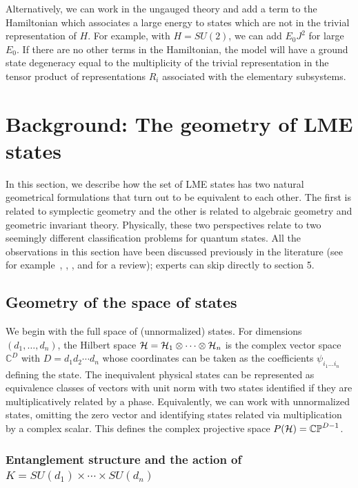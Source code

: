 \documentclass[12pt]{article}
\theoremstyle{definition}
\begin{document}
Alternatively, we can work in the ungauged theory and add a term to the Hamiltonian which associates a large energy to states which are not in the trivial representation of $H$. For example, with $H = SU(2)$, we can add $E_0 J^2$ for large $E_0$. If there are no other terms in the Hamiltonian, the model will have a ground state degeneracy equal to the multiplicity of the trivial representation in the tensor product of representations $R_i$ associated with the elementary subsystems.


\section{Background: The geometry of LME states}

In this section, we describe how the set of LME states has two natural geometrical formulations that turn out to be equivalent to each other. The first is related to symplectic geometry and the other is related to algebraic geometry and geometric invariant theory. Physically, these two perspectives relate to two seemingly different classification problems for quantum states. All the observations in this section have been discussed previously in the literature (see for example~\cite{Kly02}, \cite[\S~3]{Kly07}, \cite[\S~4]{wallach}, and \cite{Walter} for a review); experts can skip directly to section 5.

\subsection{Geometry of the space of states}

We begin with the full space of (unnormalized) states. For dimensions $(d_1,\dots, d_n)$, the Hilbert space ${\cal H} = {\cal H}_1 \otimes \cdots \otimes {\cal H}_n$ is the complex vector space  $\mathbb{C}^{D}$ with $D = d_1 d_2 \cdots d_n$ whose coordinates can be taken as the coefficients $\psi_{i_1 \dots i_n}$ defining the state. The inequivalent physical states can be represented as equivalence classes of vectors with unit norm with two states identified if they are multiplicatively related by a phase. Equivalently, we can work with unnormalized states, omitting the zero vector and identifying states related via multiplication by a complex scalar. This defines the complex projective space $P({\cal H}) = \mathbb{C P}^{D-1}$.

\subsubsection{Entanglement structure and the action of $K = SU(d_1) \times \cdots \times SU(d_n)$}
\end{document}
